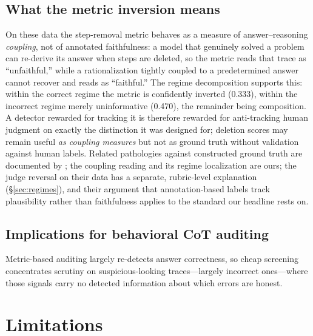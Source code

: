 \documentclass[11pt]{article}
\begin{document}
\subsection{What the metric inversion means}
\label{sec:inversion}
On these data the step-removal metric behaves as a measure of answer--reasoning \emph{coupling}, not of annotated faithfulness: a model that genuinely solved a problem can re-derive its answer when steps are deleted, so the metric reads that trace as ``unfaithful,'' while a rationalization tightly coupled to a predetermined answer cannot recover and reads as ``faithful.'' The regime decomposition supports this: within the correct regime the metric is confidently inverted (0.333), within the incorrect regime merely uninformative (0.470), the remainder being composition. A detector rewarded for tracking it is therefore rewarded for anti-tracking human judgment on exactly the distinction it was designed for; deletion scores may remain useful \emph{as coupling measures} but not as ground truth without validation against human labels. Related pathologies against constructed ground truth are documented by \citet{gurarieh2026bonafide}; the coupling reading and its regime localization are ours; the judge reversal on their data has a separate, rubric-level explanation (\S\ref{sec:regimes}), and their argument that annotation-based labels track plausibility rather than faithfulness applies to the standard our headline rests on.

\subsection{Implications for behavioral CoT auditing}
Metric-based auditing largely re-detects answer correctness, so cheap screening concentrates scrutiny on suspicious-looking traces---largely incorrect ones---where those signals carry no detected information about which errors are honest.

\section{Limitations}
\label{sec:limitations}
\end{document}
